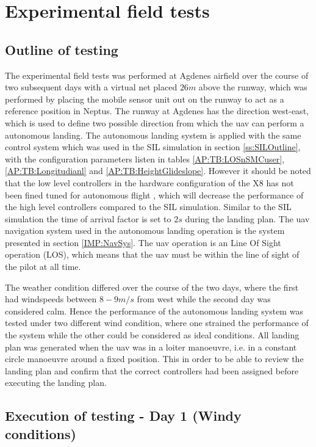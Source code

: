 \chapter{Experimental field tests}\label{Ch:ExperimentalTesting}
\section{Outline of testing}
The experimental field tests was performed at Agdenes airfield over the course of two subsequent days with a virtual net placed $26 m$ above the runway, which was performed by placing the mobile sensor unit out on the runway to act as a reference position in Neptus. The runway at Agdenes has the direction west-east, which is used to define two possible direction from which the \gls{uav} can perform a autonomous landing. The autonomous landing system is applied with the same control system which was used in the SIL simulation in section \ref{ss:SILOutline}, with the configuration parameters listen in tables \ref{AP:TB:LOSnSMCuser}, \ref{AP:TB:Longitudianl} and \ref{AP:TB:HeightGlideslope}. However it should be noted that the low level controllers in the hardware configuration of the X8 has not been fined tuned for autonomous flight \citep{Sigurd}, which will decrease the performance of the high level controllers compared to the SIL simulation. Similar to the SIL simulation the time of arrival factor is set to $2 s$ during the landing plan. The \gls{uav} navigation system used in the autonomous landing operation is the system presented in section \ref{IMP:NavSys}. The \gls{uav} operation is an Line Of Sight operation (LOS), which means that the \gls{uav} must be within the line of sight of the pilot at all time.

The weather condition differed over the course of the two days, where the first had windspeeds between $8-9 m/s$ from west while the second day was considered calm. Hence the performance of the autonomous landing system was tested under two different wind condition, where one strained the performance of the system while the other could be considered as ideal conditions. All landing plan was generated when the \gls{uav} was in a loiter manoeuvre, i.e. in a constant circle manoeuvre around a fixed position. This in order to be able to review the landing plan and confirm that the correct controllers had been assigned before executing the landing plan.
\section{Execution of testing - Day 1 (Windy conditions)}
